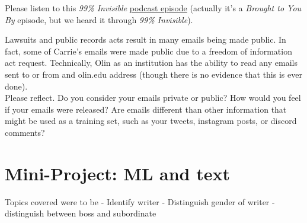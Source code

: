\documentclass[assignment04_Solutions]{subfiles}
\begin{document}
\begin{exercise}
Please listen to this \emph{99\% Invisible} \href{https://99percentinvisible.org/episode/youve-got-enron-mail/}{podcast episode} (actually it's a \emph{Brought to You By} episode, but we heard it through \emph{99\% Invisible}). 
\end{exercise}
\begin{exercise}
Lawsuits and public records acts result in many emails being made public. In fact, some of Carrie's emails were made public due to a freedom of information act request. Technically, Olin as an institution has the ability to read any emails sent to or from and olin.edu address (though there is no evidence that this is ever done). \\
Please reflect. Do you consider your emails private or public? How would you feel if your emails were released? Are emails different than other information that might be used as a training set, such as your tweets, instagram posts, or discord comments?
\end{exercise}



\section{Mini-Project: ML and text}
Topics covered were to be
- Identify writer
- Distinguish gender of writer
- distinguish between boss and subordinate 
\end{document}
